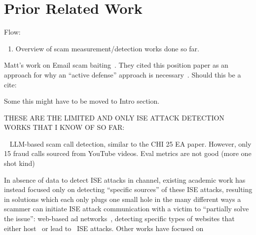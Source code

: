 \section{Prior Related Work}
\label{sec:related_work}


Flow:

\begin{enumerate}
\item Overview of scam measurement/detection works done so far. 
\end{enumerate}
Matt's work on Email scam baiting~\cite{ChenWE23}. They cited this position paper as an approach for why an ``active defense'' approach is necessary~\cite{CanhamT22}.
Should this be a cite: ~\cite{BajajE23}



Some this might have to be moved to Intro section.



THESE ARE THE LIMITED AND ONLY ISE ATTACK DETECTION WORKS THAT I KNOW OF SO FAR:
~\cite{DerakhshanHB21,}
~\cite{Zhao0LY018}

~\cite{ocleicniks2025real} LLM-based scam call detection, similar to the CHI 25 EA paper. However, only 15 fraud calls sourced from YouTube videos. Eval metrics are not good (more one shot kind)


In absence of data to detect ISE attacks in channel, existing academic work has instead focused only on detecting ``specific sources'' of these ISE attacks, resulting in solutions which each only plugs one small hole in the many different ways a scammer can initiate ISE attack communication with a victim to ``partially solve the issue'': web-based ad networks~\cite{YangALPL23,seacma,SubramaniYSVLP20}, detecting specific types of websites that either host~\cite{MiramirkhaniSN16, SrinivasanKMANA18, tasr, abs-2502-10110} or lead to~\cite{RafiqueGJHN16,VissersJN15,KharrazRK18} ISE attacks. Other works have focused on  


